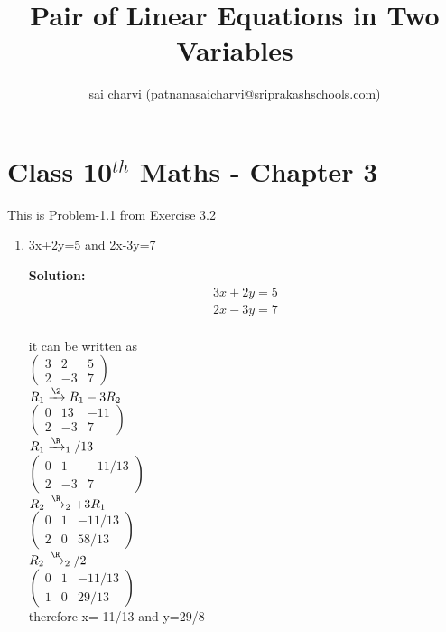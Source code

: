 \documentclass[10pt]{article}
\title{Pair of Linear Equations in Two Variables}
\author{sai charvi (patnanasaicharvi@sriprakashschools.com)}
\newcommand{\myvec}[1]{\ensuremath{\begin{pmatrix}#1\end{pmatrix}}}
\newcommand{\solution}{\noindent \textbf{Solution: }}
\begin{document}
\maketitle
\section*{Class 10$^{th}$ Maths - Chapter 3}
This is Problem-1.1 from Exercise 3.2
\begin{enumerate}
\item 3x+2y=5 and 2x-3y=7

\solution
\begin{align}
3x+2y=5\\
2x-3y=7\\
\end{align}

it can be written as\\

\myvec{3&2&5\\2&-3&7}\\

$R_1\xrightarrow\2R_1-3R_2$\\
\myvec{0&13&-11\\2&-3&7}\\

$R_1\xrightarrow\R_1/13$\\
\myvec{0&1&-11/13\\2&-3&7}\\

$R_2\xrightarrow\R_2+3R_1$\\
\myvec{0&1&-11/13\\2&0&58/13}\\

$R_2\xrightarrow\R_2/2$\\
\myvec{0&1&-11/13\\1&0&29/13}\\

therefore x=-11/13 and y=29/8
\end{enumerate}
\end{document}
